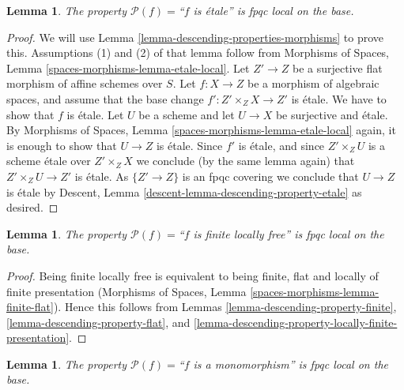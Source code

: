 \documentclass{stacks-project}
\theoremstyle{plain}
\newtheorem{lemma}[subsection]{Lemma}
\theoremstyle{definition}
\theoremstyle{remark}
\numberwithin{equation}{subsection}
\begin{document}
\begin{lemma}
\label{lemma-descending-property-etale}
The property $\mathcal{P}(f) =$``$f$ is \'etale''
is fpqc local on the base.
\end{lemma}

\begin{proof}
We will use
Lemma \ref{lemma-descending-properties-morphisms}
to prove this. Assumptions (1) and (2) of that lemma follow from
Morphisms of Spaces,
Lemma \ref{spaces-morphisms-lemma-etale-local}.
Let $Z' \to Z$ be a surjective flat morphism of affine schemes over $S$.
Let $f : X \to Z$ be a morphism of algebraic spaces, and assume
that the base change $f' : Z' \times_Z X \to Z'$ is \'etale.
We have to show that $f$ is \'etale. Let $U$ be a scheme
and let $U \to X$ be surjective and \'etale. By
Morphisms of Spaces,
Lemma \ref{spaces-morphisms-lemma-etale-local}
again, it is enough to show that $U \to Z$ is \'etale.
Since $f'$ is \'etale, and since $Z' \times_Z U$ is a
scheme \'etale over $Z' \times_Z X$ we conclude (by the same lemma again) that
$Z' \times_Z U \to Z'$ is \'etale.
As $\{Z' \to Z\}$ is an fpqc covering we conclude that
$U \to Z$ is \'etale by
Descent, Lemma \ref{descent-lemma-descending-property-etale}
as desired.
\end{proof}

\begin{lemma}
\label{lemma-descending-property-finite-locally-free}
The property $\mathcal{P}(f) =$``$f$ is finite locally free''
is fpqc local on the base.
\end{lemma}

\begin{proof}
Being finite locally free is equivalent to being
finite, flat and locally of finite presentation
(Morphisms of Spaces, Lemma \ref{spaces-morphisms-lemma-finite-flat}).
Hence this follows from Lemmas
\ref{lemma-descending-property-finite},
\ref{lemma-descending-property-flat}, and
\ref{lemma-descending-property-locally-finite-presentation}.
\end{proof}

\begin{lemma}
\label{lemma-descending-property-monomorphism}
The property $\mathcal{P}(f) =$``$f$ is a monomorphism''
is fpqc local on the base.
\end{lemma}
\end{document}
